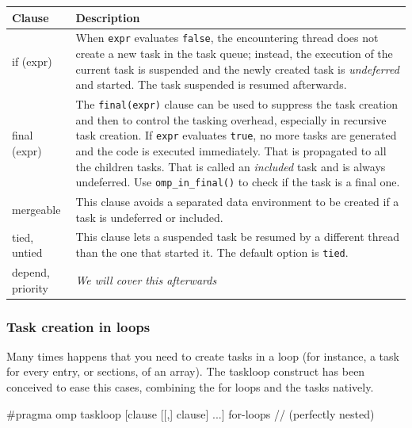 \begin{center}
	\small
\renewcommand{\arraystretch}{1.4}
\begin{tabular}{@{} >{\ttfamily\footnotesize}l p{} @{}}
\toprule
\textbf{Clause} & \textbf{Description} \\
\midrule
if (expr) & When \texttt{expr} evaluates \texttt{false}, the encountering thread does not create a new task in the task queue; instead, the execution of the current task is suspended and the newly created task is \textit{undeferred} and started. The task suspended is resumed afterwards. \\

final (expr) & The \texttt{final(expr)} clause can be used to suppress the task creation and then to control the tasking overhead, especially in recursive task creation. If \texttt{expr} evaluates \texttt{true}, no more tasks are generated and the code is executed immediately. That is propagated to all the children tasks. That is called an \textit{included} task and is always undeferred. Use \texttt{omp\_in\_final()} to check if the task is a final one. \\

mergeable & This clause avoids a separated data environment to be created if a task is undeferred or included. \\

tied, untied & This clause lets a suspended task be resumed by a different thread than the one that started it. The default option is \texttt{tied}. \\

depend, priority & \textit{We will cover this afterwards} \\

\bottomrule
\end{tabular}
\normalsize
\end{center}

\subsubsection{Task creation in loops}

Many times happens that you need to create tasks in a loop (for instance, a task for every entry, or sections, of an array).
The taskloop construct has been conceived to ease this cases, combining the for loops and the tasks natively.

\begin{codeblock}[language = C]
#pragma omp taskloop [clause [[,] clause] ...]
{
    for-loops // (perfectly nested)
}
\end{codeblock}

